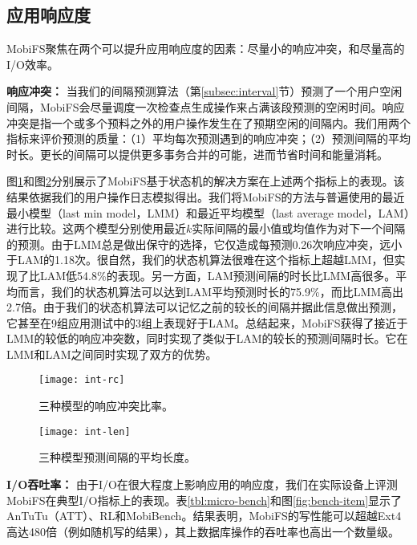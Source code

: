 \subsection{应用响应度} \label{subsec-eval-resp}

MobiFS聚焦在两个可以提升应用响应度的因素：尽量小的响应冲突，和尽量高的I/O效率。

\noindent\textbf{响应冲突：}
当我们的间隔预测算法（第\ref{subsec:interval}节）预测了一个用户空闲间隔，MobiFS会尽量调度一次检查点生成操作来占满该段预测的空闲时间。响应冲突是指一个或多个预料之外的用户操作发生在了预期空闲的间隔内。我们用两个指标来评价预测的质量：（1）平均每次预测遇到的响应冲突；（2）预测间隔的平均时长。更长的间隔可以提供更多事务合并的可能，进而节省时间和能量消耗。

图\ref{fig:int-rc}和图\ref{fig:int-len}分别展示了MobiFS基于状态机的解决方案在上述两个指标上的表现。该结果依据我们的用户操作日志模拟得出。我们将MobiFS的方法与普遍使用的最近最小模型（last min model，LMM）和最近平均模型（last average model，LAM）进行比较。这两个模型分别使用最近$k$实际间隔的最小值或均值作为对下一个间隔的预测。由于LMM总是做出保守的选择，它仅造成每预测0.26次响应冲突，远小于LAM的1.18次。很自然，我们的状态机算法很难在这个指标上超越LMM，但实现了比LAM低54.8\%的表现。另一方面，LAM预测间隔的时长比LMM高很多。平均而言，我们的状态机算法可以达到LAM平均预测时长的75.9\%，而比LMM高出2.7倍。由于我们的状态机算法可以记忆之前的较长的间隔并据此信息做出预测，它甚至在9组应用测试中的3组上表现好于LAM。总结起来，MobiFS获得了接近于LMM的较低的响应冲突数，同时实现了类似于LAM的较长的预测间隔时长。它在LMM和LAM之间同时实现了双方的优势。

\begin{figure}[!ht]
  \centering
  \texttt{[image: int-rc]}
  \caption{三种模型的响应冲突比率。}
  \label{fig:int-rc}
\end{figure}

\begin{figure}[!ht]
  \centering
  \texttt{[image: int-len]}
  \caption{三种模型预测间隔的平均长度。}
  \label{fig:int-len}
\end{figure}

\noindent\textbf{I/O吞吐率：}
由于I/O在很大程度上影响应用的响应度，我们在实际设备上评测MobiFS在典型I/O指标上的表现。表\ref{tbl:micro-bench}和图\ref{fig:bench-item}显示了AnTuTu（ATT）、RL和MobiBench。结果表明，MobiFS的写性能可以超越Ext4高达480倍（例如随机写的结果），其上数据库操作的吞吐率也高出一个数量级。

